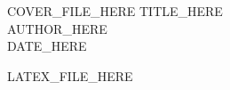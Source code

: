 \documentclass[a5paper]{book}
\begin{document}
  \begin{titlepage}
    \thispagestyle{empty}
    \pagecolor{black}
    \color{white}
    \begin{center}
        COVER_FILE_HERE
        \vfill
        {\Huge TITLE_HERE}\\
        \vspace{0.25cm}
        {\large AUTHOR_HERE}\\
        \vfill
        {\small DATE_HERE}\\
    \end{center}
  \end{titlepage}

  \pagecolor{white}
  \color{black}

  \restoregeometry
  \clearpage
  \thispagestyle{empty}
  \clearpage
  \cleardoublepage

  \begin{spacing}{1.25}
  \justifying
  LATEX_FILE_HERE
  \end{spacing}

  \cleardoublepage

\end{document}
